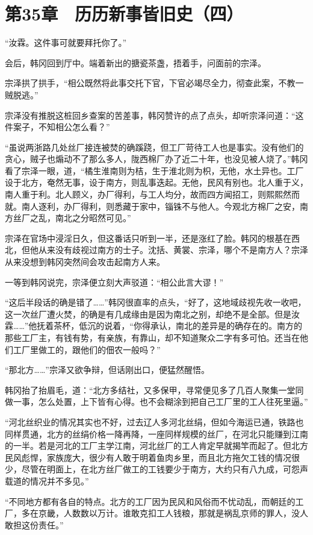 \section{第35章　历历新事皆旧史（四）}

“汝霖。这件事可就要拜托你了。”

会后，韩冈回到厅中。端着新出的搪瓷茶盏，捂着手，问面前的宗泽。

宗泽拱了拱手，“相公既然将此事交托下官，下官必竭尽全力，彻查此案，不教一贼脱逃。”

宗泽没有推脱这桩回乡查案的苦差事，韩冈赞许的点了点头，却听宗泽问道：“这件案子，不知相公怎么看？”

“虽说两浙路几处丝厂接连被焚的确蹊跷，但工厂苛待工人也是事实。没有他们的贪心，贼子也煽动不了那么多人，陇西棉厂办了近二十年，也没见被人烧了。”韩冈看了宗泽一眼，道，“橘生淮南则为桔，生于淮北则为枳，无他，水土异也。工厂设于北方，奄然无事，设于南方，则乱事迭起。无他，民风有别也。北人重于义，南人重于利。北人顾义，办厂得利，与工人均分，故而四方闻招工，则熙熙然而就。南人逐利，办厂得利，则悉藏于家中，锱铢不与他人。今观北方棉厂之安，南方丝厂之乱，南北之分昭然可见。”

宗泽在官场中浸淫日久，但这番话只听到一半，还是涨红了脸。韩冈的根基在西北，但他从来没有歧视过南方的士子。沈括、黄裳、宗泽，哪个不是南方人？宗泽从来没想到韩冈突然间会攻击起南方人来。

一等到韩冈说完，宗泽便立刻大声驳道：“相公此言大谬！”

“这后半段话的确是错了……”韩冈很直率的点头，“好了，这地域歧视先收一收吧，这一次丝厂遭火焚，的确是有几成缘由是因为南北之别，却绝不是全部。但是汝霖……”他抚着茶杯，低沉的说着，“你得承认，南北的差异是的确存在的。南方的那些工厂主，有钱有势，有亲族，有靠山，却不知道聚众二字有多可怕。还当在他们工厂里做工的，跟他们的佃农一般吗？”

“那北方……”宗泽又欲争辩，但话刚出口，便猛然醒悟。

韩冈抬了抬眉毛，道：“北方多结社，又多保甲，寻常便见多了几百人聚集一堂同做一事，怎么处置，上下皆有心得。也不会糊涂到把自己工厂里的工人往死里逼。”

“河北丝织业的情况其实也不好，过去辽人多河北丝绢，但如今海运已通，铁路也同样贯通，北方的丝绢价格一降再降，一座同样规模的丝厂，在河北只能赚到江南的一半。若是河北的工厂主学江南，河北丝厂的工人肯定早就揭竿而起了。但北方民风彪悍，家族庞大，很少有人敢于明着鱼肉乡里，而且北方拖欠工钱的情况很少，尽管在明面上，在北方丝厂做工的工钱要少于南方，大约只有八九成，可怨声载道的情况并不多见。”

“不同地方都有各自的特点。北方的工厂因为民风和风俗而不忧动乱，而朝廷的工厂，多在京畿，人数数以万计。谁敢克扣工人钱粮，那就是祸乱京师的罪人，没人敢担这份责任。”


